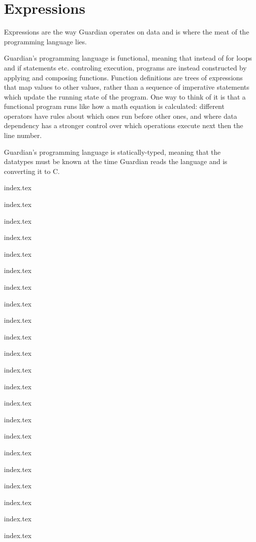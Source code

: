 
\section{Expressions}
{
	Expressions are the way Guardian operates on data and is where the meat
	of the programming language lies.
	
	Guardian's programming language is functional, meaning that instead of
	for loops and if statements etc. controling execution, programs are
	instead constructed by applying and composing functions. Function
	definitions are trees of expressions that map values to other values,
	rather than a sequence of imperative statements which update
	the running state of the program. One way to think of it is that
	a functional program runs like how a math equation is
	calculated: different operators have rules about which ones run before
	other ones, and where data dependency has a stronger control over which
	operations execute next then the line number.
	
	Guardian's programming language is statically-typed, meaning that the
	datatypes
	must be known at the time Guardian reads the language and is
	converting it to C.
	
	{index.tex}
	
	{index.tex}
	
	{index.tex}
	
	{index.tex}
	
	{index.tex}
	
	{index.tex}
	
	{index.tex}
	
	{index.tex}
	
	{index.tex}
	
	{index.tex}
	
	{index.tex}
	
	{index.tex}
	
	{index.tex}
	
	{index.tex}
	
	{index.tex}
	
	{index.tex}
	
	{index.tex}
	
	{index.tex}
	
	{index.tex}
	
	{index.tex}
	
	{index.tex}
	
	{index.tex}
	
}

